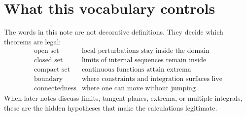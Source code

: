 \section{What this vocabulary controls}

The words in this note are not decorative definitions.  They decide which theorems are legal:
\[
\begin{array}{c|c}
\text{open set} & \text{local perturbations stay inside the domain}\\
\text{closed set} & \text{limits of internal sequences remain inside}\\
\text{compact set} & \text{continuous functions attain extrema}\\
\text{boundary} & \text{where constraints and integration surfaces live}\\
\text{connectedness} & \text{where one can move without jumping}
\end{array}
\]
When later notes discuss limits, tangent planes, extrema, or multiple integrals, these are the hidden hypotheses that make the calculations legitimate.
